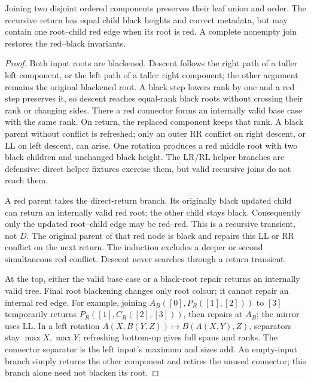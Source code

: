 \begin{lemma}
\label{lem:proof-join}
Joining two disjoint ordered components preserves their leaf union and order.
The recursive return has equal child black heights and correct metadata, but
may contain one root--child red edge when its root is red. A complete
nonempty join restores the red--black invariants.
\end{lemma}
\begin{proof}
Both input roots are blackened. Descent follows the right path of a taller
left component, or the left path of a taller right component; the other
argument remains the original blackened root. A black step lowers rank by
one and a red step preserves it, so descent reaches equal-rank black roots
without crossing their rank or changing sides. There a red connector forms
an internally valid base case with the same rank. On return, the replaced
component keeps that rank. A black parent without conflict is refreshed;
only an outer RR conflict on right descent, or LL on left descent, can arise.
One rotation produces a red middle root with two black children and unchanged
black height. The LR/RL helper branches are defensive: direct helper fixtures
exercise them, but valid recursive joins do not reach them.

A red parent takes the direct-return branch. Its originally black updated
child can return an internally valid red root; the other child stays black.
Consequently only the updated root--child edge may be red--red. This is a
recursive transient, not $D$. The original parent of that red node is black
and repairs this LL or RR conflict on the next return. The
induction excludes a deeper or second simultaneous red conflict. Descent
never searches through a return transient.

At the top, either the valid base case or a black-root repair returns an
internally valid tree. Final root blackening changes only root colour; it
cannot repair an internal red edge. For example, joining
$A_B([0],P_R([1],[2]))$ to $[3]$ temporarily returns
$P_R([1],C_R([2],[3]))$, then repairs at $A_B$; the mirror uses LL.
In a left rotation $A(X,B(Y,Z))\mapsto B(A(X,Y),Z)$, separators stay
$\max X,\max Y$; refreshing bottom-up gives full spans and ranks.
The connector separator is the left input's maximum and sizes add.
An empty-input branch simply returns the other component and retires the
unused connector; this branch alone need not blacken its root.
\end{proof}

